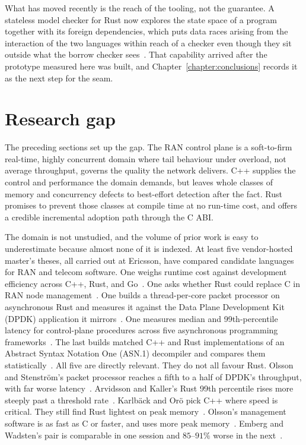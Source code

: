 \documentclass[english,oneside,a4paper,censored,csm,software-track-2020]{HYthesisML}
\begin{document}
What has moved recently is the reach of the tooling, not the guarantee. A stateless model
checker for Rust now explores the state space of a program together with its foreign
dependencies, which puts data races arising from the interaction of the two languages within
reach of a checker even though they sit outside what the borrow checker
sees~\cite{pearce2026rustmc}. That capability arrived after the prototype measured here was
built, and Chapter~\ref{chapter:conclusions} records it as the next step for the seam.

\section{Research gap}\label{sec:gap}
The preceding sections set up the gap. The RAN control plane is a soft-to-firm real-time,
highly concurrent domain where tail behaviour under overload, not average throughput, governs
the quality the network delivers. C++ supplies the control and performance the domain demands,
but leaves whole classes of memory and concurrency defects to best-effort detection after the
fact. Rust promises to prevent those classes at compile time at no run-time cost, and offers a
credible incremental adoption path through the C ABI.

The domain is not unstudied, and the volume of prior work is easy to underestimate because
almost none of it is indexed. At least five vendor-hosted master's theses, all carried out at
Ericsson, have compared candidate languages for RAN and telecom software. One weighs runtime
cost against development efficiency across C++, Rust, and Go~\cite{karlback2021ran}. One asks
whether Rust could replace C in RAN node management~\cite{olsson2023ranmgmt}. One builds a
thread-per-core packet processor on asynchronous Rust and measures it against the Data Plane
Development Kit (DPDK) application it mirrors~\cite{olsson2023asyncpackets}. One measures median and 99th-percentile
latency for control-plane procedures across five asynchronous programming
frameworks~\cite{arvidsson2025async}. The last builds matched C++ and Rust implementations of an
Abstract Syntax Notation One (ASN.1) decompiler and compares them
statistically~\cite{emberg2023asn1}. All five are directly
relevant. They do not all favour Rust. Olsson and Stenstr\"om's packet
processor reaches a fifth to a half of DPDK's throughput, with far worse
latency~\cite{olsson2023asyncpackets}. Arvidsson and Kaller's Rust 99th
percentile rises more steeply past a threshold rate~\cite{arvidsson2025async}.
Karlb\"ack and Or\"o pick C++ where speed is critical. They still find Rust
lightest on peak memory~\cite{karlback2021ran}. Olsson's management software
is as fast as C or faster, and uses more peak memory~\cite{olsson2023ranmgmt}.
Emberg and Wadsten's pair is comparable in one session and $85$--$91\%$ worse
in the next~\cite{emberg2023asn1}.
\end{document}
